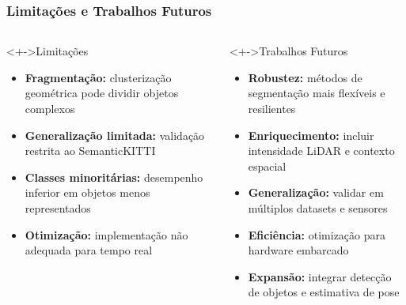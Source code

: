 \documentclass[aspectratio=169,t,xcolor=table]{beamer}
\begin{document}
\begin{frame}
    \frametitle{Limitações e Trabalhos Futuros}
    \begin{columns}[T]
        \begin{column}{.5\textwidth}
            \begin{block}<+->{Limitações}
                \begin{itemize}
                    \item<+-> \textbf{Fragmentação:} clusterização geométrica
                          pode dividir objetos complexos
                    \item<+-> \textbf{Generalização limitada:} validação
                          restrita ao SemanticKITTI
                    \item<+-> \textbf{Classes minoritárias:} desempenho
                          inferior em objetos menos representados
                    \item<+-> \textbf{Otimização:} implementação não adequada
                          para tempo real
                \end{itemize}
            \end{block}
        \end{column}
        \begin{column}{.5\textwidth}
            \begin{block}<+->{Trabalhos Futuros}
                \begin{itemize}
                    \item<+-> \textbf{Robustez:} métodos de segmentação mais
                          flexíveis e resilientes
                    \item<+-> \textbf{Enriquecimento:} incluir intensidade
                          LiDAR e contexto espacial
                    \item<+-> \textbf{Generalização:} validar em múltiplos
                          datasets e sensores
                    \item<+-> \textbf{Eficiência:} otimização para hardware
                          embarcado
                    \item<+-> \textbf{Expansão:} integrar detecção de objetos e
                          estimativa de pose
                \end{itemize}
            \end{block}
        \end{column}
    \end{columns}
\end{frame}
\end{document}
